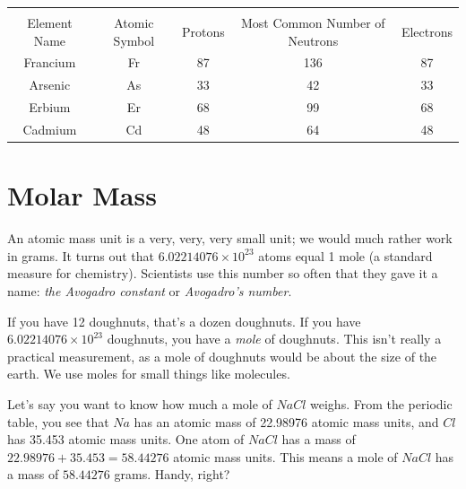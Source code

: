 \begin{Answer}[ref = pne]
\begin{tabular}{|c|c|c|c|c|}
\hline\\
Element Name & Atomic Symbol & Protons & Most Common Number of Neutrons & Electrons\\\hline
 Francium & Fr & 87 & 136 & 87 \\\hline
 Arsenic & As & 33 & 42 & 33 \\\hline
 Erbium & Er & 68 & 99 & 68 \\\hline
 Cadmium & Cd & 48 & 64 & 48 \\\hline
\end{tabular}
\end{Answer}

\section{Molar Mass}

An atomic mass unit is a very, very, very small unit; we would much
rather work in grams. It turns out that $6.02214076 \times 10^{23}$
atoms equal 1 mole (a standard measure for chemistry). Scientists use this number so often
that they gave it a name: \textit{the Avogadro constant} or
\textit{Avogadro's number}.



If you have 12 doughnuts, that's a dozen doughnuts. If you have
$6.02214076 \times 10^{23}$ doughnuts, you have a \textit{mole} of
doughnuts. This isn't really a practical measurement, as a mole of doughnuts would be about the size of the earth. We use
moles for small things like molecules.


Let's say you want to know how much a mole of $NaCl$ weighs. From the
periodic table, you see that $Na$ has an atomic mass of 22.98976
atomic mass units, and $Cl$ has 35.453 atomic mass units.  One atom of
$NaCl$ has a mass of $22.98976 + 35.453 = 58.44276$ atomic mass units.
This means a mole of $NaCl$ has a mass of $58.44276$ grams. Handy, right?


